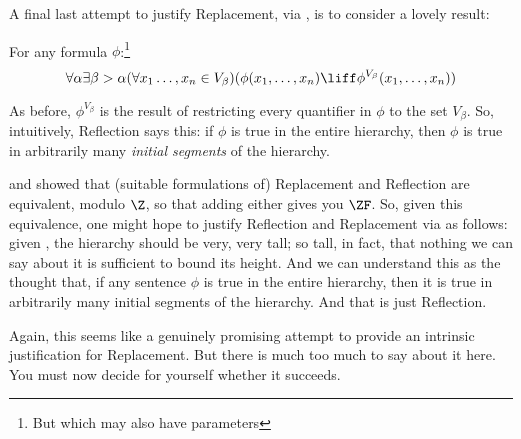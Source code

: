 \documentclass[../../../include/open-logic-section]{subfiles}
\begin{document}
A final last attempt to justify Replacement, via \stagesinex, is to consider a lovely result:
\begin{thm}For any formula $\phi$:\footnote{But which may also have parameters} $$\forall \alpha \exists \beta > \alpha (\forall x_1 \ldots, x_n \in V_\beta)(\phi(x_1, \ldots, x_n) \liff \phi^{V_\beta}(x_1, \ldots, x_n))$$
\end{thm}
\noindent As before, $\phi^{V_\beta}$ is the result of restricting every quantifier in $\phi$ to the set $V_\beta$. So, intuitively, Reflection says this: if $\phi$ is true in the entire hierarchy, then $\phi$ is true in arbitrarily many \emph{initial segments} of the hierarchy. 

\citet{Montague1961} and \citet{Levy1960} showed that (suitable formulations of) Replacement and Reflection are equivalent, modulo $\Z$, so that adding either gives you $\ZF$. So, given this equivalence, one might hope to justify Reflection  and Replacement via \stagesinex{} as follows: given \stagesinex, the hierarchy should be very, very tall; so tall, in fact, that nothing we can say about it is sufficient to bound its height. And we can understand this as the thought that, if any sentence $\phi$ is true in the entire hierarchy, then it is true in arbitrarily many initial segments of the hierarchy. And that is just Reflection. 

Again, this seems like a genuinely promising attempt to provide an intrinsic justification for Replacement. But there is much too much to say about it here. You must now decide for yourself whether it succeeds.
\end{document}
